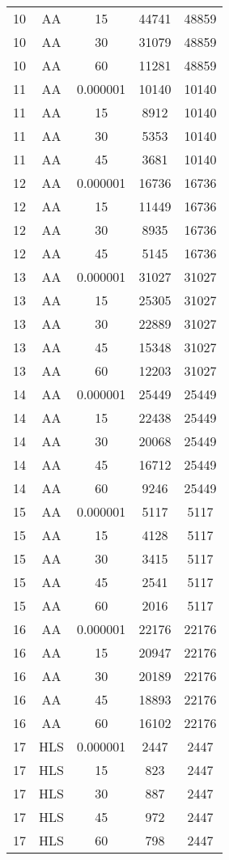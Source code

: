 \begin{center}
\begin{longtable}{ccccc}
10	&	AA	&	15	&	44741	&	48859	\\
10	&	AA	&	30	&	31079	&	48859	\\
10	&	AA	&	60	&	11281	&	48859	\\
11	&	AA	&	0.000001	&	10140	&	10140	\\
11	&	AA	&	15	&	8912	&	10140	\\
11	&	AA	&	30	&	5353	&	10140	\\
11	&	AA	&	45	&	3681	&	10140	\\
12	&	AA	&	0.000001	&	16736	&	16736	\\
12	&	AA	&	15	&	11449	&	16736	\\
12	&	AA	&	30	&	8935	&	16736	\\
12	&	AA	&	45	&	5145	&	16736	\\
13	&	AA	&	0.000001	&	31027	&	31027	\\
13	&	AA	&	15	&	25305	&	31027	\\
13	&	AA	&	30	&	22889	&	31027	\\
13	&	AA	&	45	&	15348	&	31027	\\
13	&	AA	&	60	&	12203	&	31027	\\
14	&	AA	&	0.000001	&	25449	&	25449	\\
14	&	AA	&	15	&	22438	&	25449	\\
14	&	AA	&	30	&	20068	&	25449	\\
14	&	AA	&	45	&	16712	&	25449	\\
14	&	AA	&	60	&	9246	&	25449	\\
15	&	AA	&	0.000001	&	5117	&	5117	\\
15	&	AA	&	15	&	4128	&	5117	\\
15	&	AA	&	30	&	3415	&	5117	\\
15	&	AA	&	45	&	2541	&	5117	\\
15	&	AA	&	60	&	2016	&	5117	\\
16	&	AA	&	0.000001	&	22176	&	22176	\\
16	&	AA	&	15	&	20947	&	22176	\\
16	&	AA	&	30	&	20189	&	22176	\\
16	&	AA	&	45	&	18893	&	22176	\\
16	&	AA	&	60	&	16102	&	22176	\\
17	&	HLS	&	0.000001	&	2447	&	2447	\\
17	&	HLS	&	15	&	823	&	2447	\\
17	&	HLS	&	30	&	887	&	2447	\\
17	&	HLS	&	45	&	972	&	2447	\\
17	&	HLS	&	60	&	798	&	2447	\\

\end{longtable}
\end{center}
